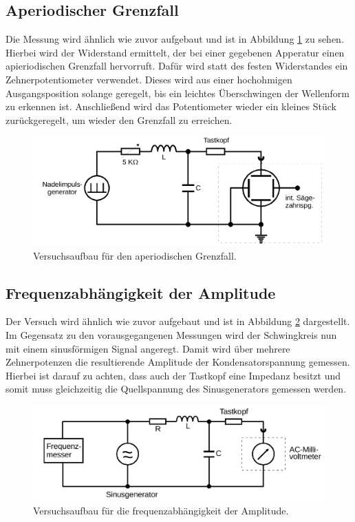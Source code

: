 \subsection{Aperiodischer Grenzfall}
Die Messung wird ähnlich wie zuvor aufgebaut und ist in Abbildung \ref{fig:aufbau2} zu sehen.
Hierbei wird der Widerstand ermittelt, der bei einer gegebenen Apperatur einen apieriodischen Grenzfall hervorruft.
Dafür wird statt des festen Widerstandes ein Zehnerpotentiometer verwendet. 
Dieses wird aus einer hochohmigen Ausgangsposition solange geregelt, bis ein leichtes Überschwingen der Wellenform zu erkennen ist.
Anschließend wird das Potentiometer wieder ein kleines Stück zurückgeregelt, um wieder den Grenzfall zu erreichen.
\begin{figure}[H]
    \centering
    \caption{Versuchsaufbau für den aperiodischen Grenzfall.\cite{v354}}
    \label{fig:aufbau2}
    \includegraphics[width=\textwidth]{content/aufbau2.png}
\end{figure}
\noindent
%
\subsection{Frequenzabhängigkeit der Amplitude}
Der Versuch wird ähnlich wie zuvor aufgebaut und ist in Abbildung \ref{fig:aufbau3} dargestellt.
Im Gegensatz zu den vorausgegangenen Messungen wird der Schwingkreis nun mit einem sinusförmigen Signal angeregt.
Damit wird über mehrere Zehnerpotenzen die resultierende Amplitude der Kondensatorspannung gemessen.
Hierbei ist darauf zu achten, dass auch der Tastkopf eine Impedanz besitzt und somit muss gleichzeitig die Quellspannung des Sinusgenerators gemessen werden.
\begin{figure}[H]
    \centering
    \caption{Versuchsaufbau für die frequenzabhängigkeit der Amplitude.\cite{v354}}
    \label{fig:aufbau3}
    \includegraphics[width=\textwidth]{content/aufbau3.png}
\end{figure}
\noindent
%
